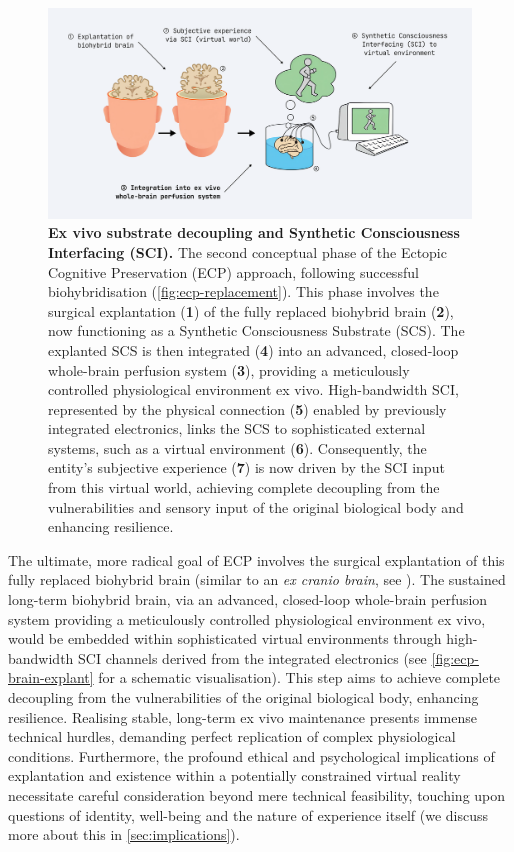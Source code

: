 \documentclass[10pt]{article}
\begin{document}
\begin{sloppypar}
  \begin{figure}[ht]
    \centering
    \includegraphics[width=\textwidth]{figures/ecp-brain-explant.png}
    \caption[ECP: Ex vivo substrate decoupling and synthetic consciousness interfacing]{\textbf{Ex vivo substrate decoupling and Synthetic Consciousness Interfacing (SCI).} The second conceptual phase of the Ectopic Cognitive Preservation (ECP) approach, following successful biohybridisation (\autoref{fig:ecp-replacement}). This phase involves the surgical explantation (\textbf{1}) of the fully replaced biohybrid brain (\textbf{2}), now functioning as a Synthetic Consciousness Substrate (SCS). The explanted SCS is then integrated (\textbf{4}) into an advanced, closed-loop whole-brain perfusion system (\textbf{3}), providing a meticulously controlled physiological environment ex vivo. High-bandwidth SCI, represented by the physical connection (\textbf{5}) enabled by previously integrated electronics, links the SCS to sophisticated external systems, such as a virtual environment (\textbf{6}). Consequently, the entity’s subjective experience (\textbf{7}) is now driven by the SCI input from this virtual world, achieving complete decoupling from the vulnerabilities and sensory input of the original biological body and enhancing resilience.}
    \label{fig:ecp-brain-explant}
  \end{figure}

  The ultimate, more radical goal of ECP involves the surgical explantation of this fully replaced biohybrid brain (similar to an \emph{ex cranio brain}, see \cite{vrselja_restoration_2019}). The sustained long-term biohybrid brain, via an advanced, closed-loop whole-brain perfusion system providing a meticulously controlled physiological environment ex vivo, would be embedded within sophisticated virtual environments through high-bandwidth SCI channels derived from the integrated electronics (see \autoref{fig:ecp-brain-explant} for a schematic visualisation). This step aims to achieve complete decoupling from the vulnerabilities of the original biological body, enhancing resilience. Realising stable, long-term ex vivo maintenance presents immense technical hurdles, demanding perfect replication of complex physiological conditions. Furthermore, the profound ethical and psychological implications of explantation and existence within a potentially constrained virtual reality necessitate careful consideration beyond mere technical feasibility, touching upon questions of identity, well-being and the nature of experience itself (we discuss more about this in \autoref{sec:implications}).



\end{sloppypar}
\end{document}
